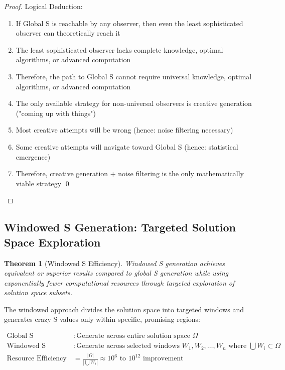 \documentclass[12pt,a4paper]{article}
\newtheorem{theorem}{Theorem}[section]
\begin{document}
{{{{{{{{{{{{{{\begin{proof}
Logical Deduction:
\begin{enumerate}
\item If Global S is reachable by any observer, then even the least sophisticated observer can theoretically reach it
\item The least sophisticated observer lacks complete knowledge, optimal algorithms, or advanced computation
\item Therefore, the path to Global S cannot require universal knowledge, optimal algorithms, or advanced computation
\item The only available strategy for non-universal observers is creative generation ("coming up with things")
\item Most creative attempts will be wrong (hence: noise filtering necessary)
\item Some creative attempts will navigate toward Global S (hence: statistical emergence)
\item Therefore, creative generation + noise filtering is the only mathematically viable strategy \qed
\end{enumerate}
\end{proof}

\subsection{Windowed S Generation: Targeted Solution Space Exploration}

\begin{theorem}[Windowed S Efficiency]
Windowed S generation achieves equivalent or superior results compared to global S generation while using exponentially fewer computational resources through targeted exploration of solution space subsets.
\end{theorem}

The windowed approach divides the solution space into targeted windows and generates crazy S values only within specific, promising regions:

\begin{align}
\text{Global S Generation} &: \text{Generate across entire solution space } \Omega \\
\text{Windowed S Generation} &: \text{Generate across selected windows } W_1, W_2, \ldots, W_n \text{ where } \bigcup W_i \subset \Omega \\
\text{Resource Efficiency} &= \frac{|\Omega|}{|\bigcup W_i|} \approx 10^6 \text{ to } 10^{12} \text{ improvement}
\end{align}

}}}}}}}}}}}}}}
\end{document}
